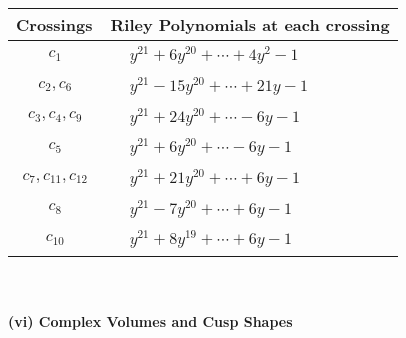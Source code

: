 \documentclass[1p]{elsarticle_modified}
\theoremstyle{definition}
\begin{document}
\begin{tabular}{m{50pt}|m{274pt}}
Crossings & \hspace{64pt}Riley Polynomials at each crossing \\
\hline $$\begin{aligned}c_{1}\end{aligned}$$&$\begin{aligned}
&y^{21}+6 y^{20}+\cdots+4 y^2-1
\end{aligned}$\\
\hline $$\begin{aligned}c_{2},c_{6}\end{aligned}$$&$\begin{aligned}
&y^{21}-15 y^{20}+\cdots+21 y-1
\end{aligned}$\\
\hline $$\begin{aligned}c_{3},c_{4},c_{9}\end{aligned}$$&$\begin{aligned}
&y^{21}+24 y^{20}+\cdots-6 y-1
\end{aligned}$\\
\hline $$\begin{aligned}c_{5}\end{aligned}$$&$\begin{aligned}
&y^{21}+6 y^{20}+\cdots-6 y-1
\end{aligned}$\\
\hline $$\begin{aligned}c_{7},c_{11},c_{12}\end{aligned}$$&$\begin{aligned}
&y^{21}+21 y^{20}+\cdots+6 y-1
\end{aligned}$\\
\hline $$\begin{aligned}c_{8}\end{aligned}$$&$\begin{aligned}
&y^{21}-7 y^{20}+\cdots+6 y-1
\end{aligned}$\\
\hline $$\begin{aligned}c_{10}\end{aligned}$$&$\begin{aligned}
&y^{21}+8 y^{19}+\cdots+6 y-1
\end{aligned}$\\
\hline
\end{tabular}\\~\\
\newpage\flushleft \textbf{(vi) Complex Volumes and Cusp Shapes}
\end{document}
